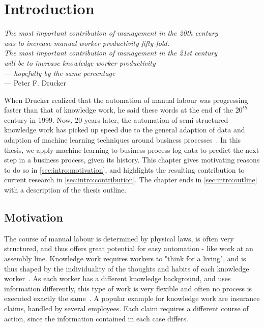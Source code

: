 \chapter{Introduction}\label{sec:intro}
\begin{flushright}{\slshape    
The most important contribution of management in the 20th century\\
was to increase manual worker productivity fifty-fold.\\
The most important contribution of management in the 21st century\\
will be to increase knowledge worker productivity\\
— hopefully by the same percentage} \\ \medskip
--- Peter F. Drucker~\cite{drucker1999}
\end{flushright}

When Drucker realized that the automation of manual labour was progressing faster than that of knowledge work, he said these words at the end of the $20^{th}$ century in 1999. Now, 20 years later, the automation of semi-structured knowledge work has picked up speed due to the general adaption of data and adaption of machine learning techniques around business processes~\cite{boehmer2018probability, klinkmuller2018reliablemonitoring}.
In this thesis, we apply machine learning to business process log data to predict the next step in a business process, given its history. This chapter gives motivating reasons to do so in \autoref{sec:intro:motivation}, and highlights the resulting contribution to current research in \autoref{sec:intro:contribution}. The chapter ends in \autoref{sec:intro:outline} with a description of the thesis outline.

\section{Motivation} \label{sec:intro:motivation}
The course of manual labour is determined by physical laws, is often very structured, and thus offers great potential for easy automation - like work at an assembly line. Knowledge work requires workers to "think for a living", and is thus shaped by the individuality of the thoughts and habits of each knowledge worker~\cite{drucker1999}. As each worker has a different knowledge background, and uses information differently, this type of work is very flexible and often no process is executed exactly the same~\cite{hewelt2016}. A popular example for knowledge work are insurance claims, handled by several employees. Each claim requires a different course of action, since the information contained in each case differs.\\

